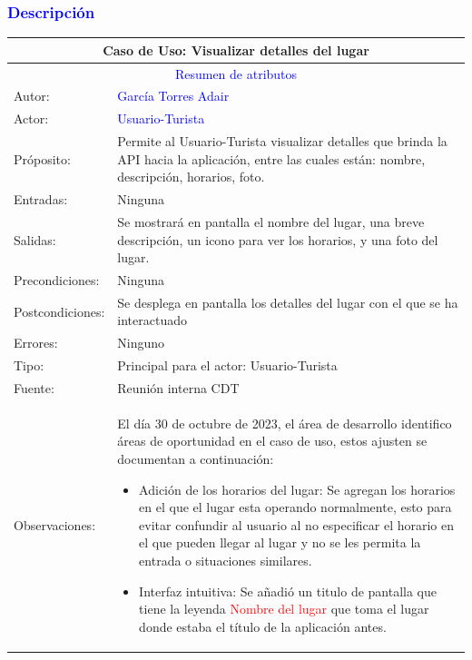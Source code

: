 \subsubsection{\textcolor{blue}{Descripción}}
\begin{tabularx}{16cm}{||l|X||}
	\hline
	\multicolumn{2}{||c||}{Caso de Uso: Visualizar detalles del lugar} \\
	\hline
	\multicolumn{2}{||c||}{\textcolor{blue}{Resumen de atributos}} \\
        \hline
	{Autor:} & {\textcolor{blue}{García Torres Adair}} \\
	\hline
	{Actor:} & {\textcolor{blue}{Usuario-Turista}} \\
	\hline
	{Próposito:} & {
            Permite al Usuario-Turista visualizar detalles que brinda la API hacia la aplicación, entre las cuales están: nombre, descripción, horarios, foto.
 
    } \\
	\hline
	{Entradas:} & {Ninguna}\\
	\hline
	{Salidas:} & {Se mostrará en pantalla el nombre del lugar, una breve descripción, un icono para ver los horarios, y una foto del lugar.}\\
	\hline
	{Precondiciones:} & {Ninguna}\\ 
	\hline
	{Postcondiciones:} & {Se desplega en pantalla los detalles del lugar con el que se ha interactuado}\\
	\hline
	{Errores:} & {Ninguno} \\
	\hline
	{Tipo:} & {Principal para el actor: Usuario-Turista}\\
	\hline
	{Fuente:} & {Reunión interna CDT} \\
	\hline
	
    Observaciones: & El día 30 de octubre de 2023, el área de desarrollo identifico áreas de oportunidad en el caso de uso, estos ajusten se documentan a continuación:
                \begin{itemize}
                    \item {
                   Adición de los horarios del lugar: Se agregan los horarios en el que el lugar esta operando normalmente, esto para evitar confundir al usuario al no especificar el horario en el que pueden llegar al lugar y no se les permita la entrada o situaciones similares.
                    }
                    \item {
                    Interfaz intuitiva: Se añadió un titulo de pantalla que tiene la leyenda \textcolor{red}{Nombre del lugar} que toma el lugar donde estaba el título de la aplicación antes.
                    }
                \end{itemize}


 
     \\
	\hline
\end{tabularx}

